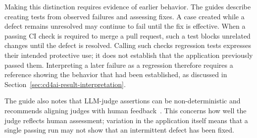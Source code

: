 Making this distinction requires evidence of earlier behavior. The guides
describe creating tests from observed failures and assessing fixes. A case
created while a defect remains unresolved may continue to fail until the fix
is effective. When a passing CI check is required to merge a pull request, such
a test blocks unrelated changes until the defect is resolved. Calling such
checks regression tests expresses their intended protective use; it does not
establish that the application previously passed them. Interpreting a later
failure as a regression therefore requires a reference showing the behavior
that had been established, as discussed in
Section~\ref{sec:cd4ai-result-interpretation}.

The guide also notes that LLM-judge assertions can be non-deterministic and
recommends aligning judges with human
feedback~\parencite{MLflow:RegressionGuide}. This concerns how well the judge
reflects human assessment; variation in the application itself means that a
single passing run may not show that an intermittent defect has been fixed.

